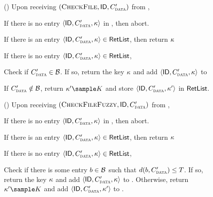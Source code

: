 \begin{figure}[h]
{\begin{minipage}[t]{\textwidth}
		
		\item () Upon receiving $(\checkContent,  \genericFileID, \clientMeta')$ from \server, 
		\enumListStartResume

		\item If there is no entry $\langle \genericFileID, \clientMeta', \genericSymmKey \rangle$ in \keyList, then abort. 

		\item If there is an entry $\langle \genericFileID, \clientMeta', \genericSymmKey \rangle \in \retList$, then return $\kappa$
	
	\item If there is no entry $\langle \genericFileID, \clientMeta', \genericSymmKey \rangle \in \retList$, 
	\itemListStart
	\item Check if $\clientMeta' \in \blocklist$. If so, return the key $\kappa$ and add  $\langle \genericFileID, \clientMeta', \genericSymmKey \rangle$ to \retList
		\item If $\clientMeta' \notin \blocklist$, return $	\genericSymmKey' \getsr \encryptKeySpace$ and store $\langle \genericFileID, \clientMeta', \genericSymmKey' \rangle$ in $\mathsf{RetList}$.

	\itemListEnd

		\enumListEnd

		\item () Upon receiving $(\checkContentFuzzy,  \genericFileID, \clientMeta')$ from \server, 
		\enumListStart
		\item If there is no entry $\langle \genericFileID, \clientMeta', \genericSymmKey \rangle$ in \keyList, then abort. 
		\item If there is an entry $\langle \genericFileID, \clientMeta', \genericSymmKey \rangle \in \retList$, then return $\kappa$

		\item If there is no entry $\langle \genericFileID, \clientMeta', \genericSymmKey \rangle \in \retList$, 
		\itemListStart
		\item Check if there is some entry $\genericBlocklistElmt \in \blocklist$ such that $\distanceNotation[\distance][\genericBlocklistElmt][\clientMeta'] \le \threshold$. If so, return the key $\kappa$ and add $\langle \genericFileID, \clientMeta', \genericSymmKey \rangle$ to \retList. Otherwise, return $\genericSymmKey' \sample \encryptKeySpace$ and add $\langle \genericFileID, \clientMeta', \genericSymmKey' \rangle$ to \retList.



\end{minipage}}
\end{figure}
